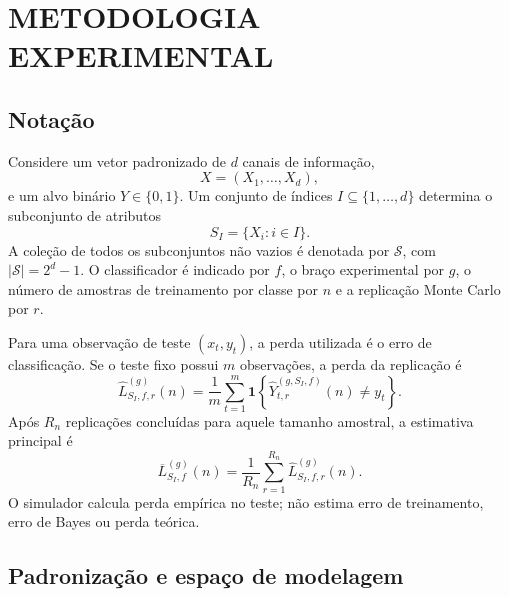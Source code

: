 
\chapter{METODOLOGIA EXPERIMENTAL}

\section{Notação}

Considere um vetor padronizado de $d$ canais de informação,
\begin{equation}
  X=(X_1,\ldots,X_d),
\end{equation}
e um alvo binário $Y\in\{0,1\}$. Um conjunto de índices $I\subseteq\{1,\ldots,d\}$ determina o subconjunto de atributos
\begin{equation}
  S_I=\{X_i:i\in I\}.
\end{equation}
A coleção de todos os subconjuntos não vazios é denotada por $\mathcal{S}$, com $|\mathcal{S}|=2^d-1$. O classificador é indicado por $f$, o braço experimental por $g$, o número de amostras de treinamento por classe por $n$ e a replicação Monte Carlo por $r$.

Para uma observação de teste $(x_t,y_t)$, a perda utilizada é o erro de classificação. Se o teste fixo possui $m$ observações, a perda da replicação é
\begin{equation}
  \widehat{L}^{(g)}_{S_I,f,r}(n)
  =\frac{1}{m}\sum_{t=1}^{m}
  \mathbf{1}\!\left\{\widehat{Y}^{(g,S_I,f)}_{t,r}(n)\neq y_t\right\}.
  \label{eq:replication-loss}
\end{equation}
Após $R_n$ replicações concluídas para aquele tamanho amostral, a estimativa principal é
\begin{equation}
  \overline{L}^{(g)}_{S_I,f}(n)
  =\frac{1}{R_n}\sum_{r=1}^{R_n}\widehat{L}^{(g)}_{S_I,f,r}(n).
  \label{eq:mean-loss}
\end{equation}
O simulador calcula perda empírica no teste; não estima erro de treinamento, erro de Bayes ou perda teórica.

\section{Padronização e espaço de modelagem}

